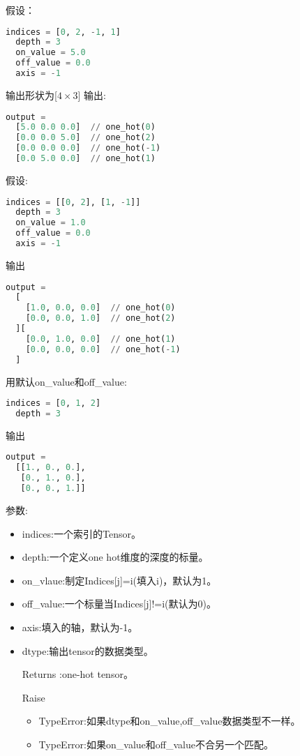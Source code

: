 假设：
\begin{lstlisting}[language=Python]
indices = [0, 2, -1, 1]
  depth = 3
  on_value = 5.0
  off_value = 0.0
  axis = -1
\end{lstlisting}
输出形状为[$4\times3$]
输出:
\begin{lstlisting}[language=Python]
output =
  [5.0 0.0 0.0]  // one_hot(0)
  [0.0 0.0 5.0]  // one_hot(2)
  [0.0 0.0 0.0]  // one_hot(-1)
  [0.0 5.0 0.0]  // one_hot(1)
\end{lstlisting}
假设:
\begin{lstlisting}[language=Python]
 indices = [[0, 2], [1, -1]]
  depth = 3
  on_value = 1.0
  off_value = 0.0
  axis = -1

\end{lstlisting}
输出
\begin{lstlisting}[language=Python]
output =
  [
    [1.0, 0.0, 0.0]  // one_hot(0)
    [0.0, 0.0, 1.0]  // one_hot(2)
  ][
    [0.0, 1.0, 0.0]  // one_hot(1)
    [0.0, 0.0, 0.0]  // one_hot(-1)
  ]
\end{lstlisting}
用默认on\_value和off\_value:
\begin{lstlisting}[language=Python]
indices = [0, 1, 2]
  depth = 3
\end{lstlisting}
输出
\begin{lstlisting}[language=Python]
  output =
  [[1., 0., 0.],
   [0., 1., 0.],
   [0., 0., 1.]]
\end{lstlisting}
参数:
\begin{itemize}
\item indices:一个索引的Tensor。
\item depth:一个定义one hot维度的深度的标量。
\item on\_vlaue:制定Indices[j]=i(填入i)，默认为1。
\item off\_value:一个标量当Indices[j]!=i(默认为0)。
\item axis:填入的轴，默认为-1。
\item dtype:输出tensor的数据类型。
\item [Returns]:one-hot tensor。
\item [Raise]
\begin{itemize}
\item TypeError:如果dtype和on\_value,off\_value数据类型不一样。
\item TypeError:如果on\_value和off\_value不合另一个匹配。
\end{itemize}
\end{itemize}
